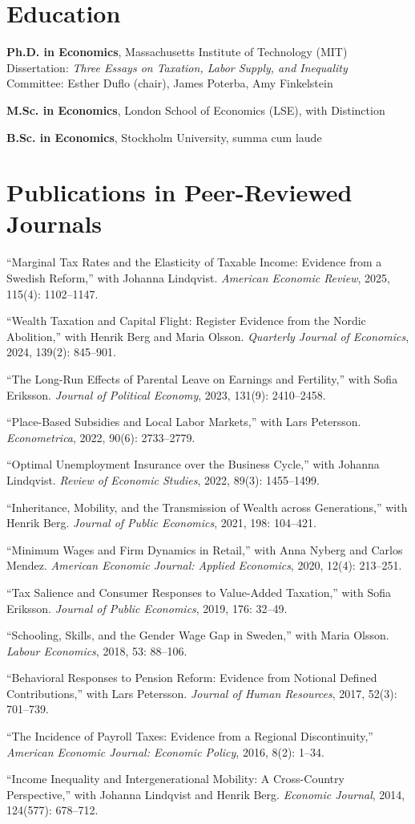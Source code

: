 \documentclass[11pt]{article}
\newcommand{\dated}[2]{%
  \noindent\makebox[5.2em][l]{\textcolor{mutedgray}{#1}}%
  \begin{minipage}[t]{\dimexpr\linewidth-5.4em\relax}#2\end{minipage}\par\vspace{3pt}}
\newcommand{\pubitem}[1]{\item #1}
\begin{document}
\section{Education}
\dated{2011}{\textbf{Ph.D. in Economics}, Massachusetts Institute of Technology (MIT)\\
  Dissertation: \emph{Three Essays on Taxation, Labor Supply, and Inequality}\\
  Committee: Esther Duflo (chair), James Poterba, Amy Finkelstein}
\dated{2006}{\textbf{M.Sc. in Economics}, London School of Economics (LSE), with Distinction}
\dated{2004}{\textbf{B.Sc. in Economics}, Stockholm University, summa cum laude}

\section{Publications in Peer-Reviewed Journals}
\begin{cvlist}
\pubitem{``Marginal Tax Rates and the Elasticity of Taxable Income: Evidence from a Swedish Reform,'' with Johanna Lindqvist. \emph{American Economic Review}, 2025, 115(4): 1102--1147.}
\pubitem{``Wealth Taxation and Capital Flight: Register Evidence from the Nordic Abolition,'' with Henrik Berg and Maria Olsson. \emph{Quarterly Journal of Economics}, 2024, 139(2): 845--901.}
\pubitem{``The Long-Run Effects of Parental Leave on Earnings and Fertility,'' with Sofia Eriksson. \emph{Journal of Political Economy}, 2023, 131(9): 2410--2458.}
\pubitem{``Place-Based Subsidies and Local Labor Markets,'' with Lars Petersson. \emph{Econometrica}, 2022, 90(6): 2733--2779.}
\pubitem{``Optimal Unemployment Insurance over the Business Cycle,'' with Johanna Lindqvist. \emph{Review of Economic Studies}, 2022, 89(3): 1455--1499.}
\pubitem{``Inheritance, Mobility, and the Transmission of Wealth across Generations,'' with Henrik Berg. \emph{Journal of Public Economics}, 2021, 198: 104--421.}
\pubitem{``Minimum Wages and Firm Dynamics in Retail,'' with Anna Nyberg and Carlos Mendez. \emph{American Economic Journal: Applied Economics}, 2020, 12(4): 213--251.}
\pubitem{``Tax Salience and Consumer Responses to Value-Added Taxation,'' with Sofia Eriksson. \emph{Journal of Public Economics}, 2019, 176: 32--49.}
\pubitem{``Schooling, Skills, and the Gender Wage Gap in Sweden,'' with Maria Olsson. \emph{Labour Economics}, 2018, 53: 88--106.}
\pubitem{``Behavioral Responses to Pension Reform: Evidence from Notional Defined Contributions,'' with Lars Petersson. \emph{Journal of Human Resources}, 2017, 52(3): 701--739.}
\pubitem{``The Incidence of Payroll Taxes: Evidence from a Regional Discontinuity,'' \emph{American Economic Journal: Economic Policy}, 2016, 8(2): 1--34.}
\pubitem{``Income Inequality and Intergenerational Mobility: A Cross-Country Perspective,'' with Johanna Lindqvist and Henrik Berg. \emph{Economic Journal}, 2014, 124(577): 678--712.}
\end{cvlist}
\end{document}
